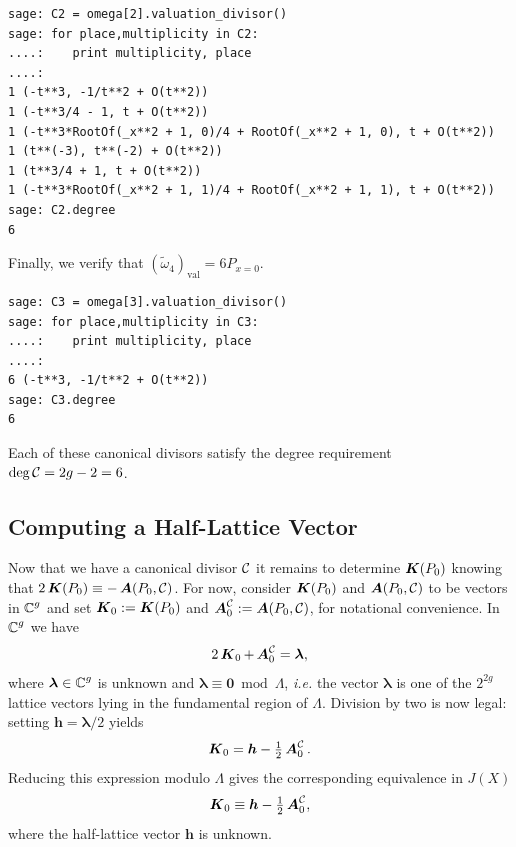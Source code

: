 \begin{example}
\begin{lstlisting}
sage: C2 = omega[2].valuation_divisor()
sage: for place,multiplicity in C2:
....:    print multiplicity, place
....:
1 (-t**3, -1/t**2 + O(t**2))
1 (-t**3/4 - 1, t + O(t**2))
1 (-t**3*RootOf(_x**2 + 1, 0)/4 + RootOf(_x**2 + 1, 0), t + O(t**2))
1 (t**(-3), t**(-2) + O(t**2))
1 (t**3/4 + 1, t + O(t**2))
1 (-t**3*RootOf(_x**2 + 1, 1)/4 + RootOf(_x**2 + 1, 1), t + O(t**2))
sage: C2.degree
6
\end{lstlisting}
Finally, we verify that $(\tilde{\omega}_4)_\text{val} = 6P_{x=0}$.
\begin{lstlisting}
sage: C3 = omega[3].valuation_divisor()
sage: for place,multiplicity in C3:
....:    print multiplicity, place
....:
6 (-t**3, -1/t**2 + O(t**2))
sage: C3.degree
6
\end{lstlisting}
Each of these canonical divisors satisfy the degree requirement $\deg \operatorname{\mathcal{C}} =
2g-2 = 6$.
\end{example}


\subsection{Computing a Half-Lattice Vector}


Now that we have a canonical divisor $\operatorname{\mathcal{C}}$ it remains to determine $\operatorname{\boldsymbol{K}}(P_0)$
knowing that $2\operatorname{\boldsymbol{K}}(P_0) \equiv - \operatorname{\boldsymbol{A}}(P_0,\operatorname{\mathcal{C}})$. For now, consider
$\operatorname{\boldsymbol{K}}(P_0)$ and $\operatorname{\boldsymbol{A}}(P_0,\operatorname{\mathcal{C}})$ to be vectors in $\operatorname{\mathbb{C}}^g$ and set $\operatorname{\boldsymbol{K}}_0 :=
\operatorname{\boldsymbol{K}}(P_0)$ and $\operatorname{\boldsymbol{A}}_0^{\operatorname{\mathcal{C}}} := \operatorname{\boldsymbol{A}}(P_0,\operatorname{\mathcal{C}})$, for notational
convenience. In $\operatorname{\mathbb{C}}^g$ we have
\begin{equation}
2\operatorname{\boldsymbol{K}}_0 + \operatorname{\boldsymbol{A}}_0^{\operatorname{\mathcal{C}}} = \boldsymbol{\lambda},
\end{equation}
where $\boldsymbol{\lambda} \in \operatorname{\mathbb{C}}^g$ is unknown and $\boldsymbol{\lambda}
\equiv \boldsymbol{0} \bmod{\Lambda}$, {\it i.e.} the vector
$\boldsymbol{\lambda}$ is one of the $2^{2g}$ lattice vectors lying in the
fundamental region of $\Lambda$. Division by two is now legal: setting
$\boldsymbol{h} = \boldsymbol{\lambda}/2$ yields
\begin{equation}
\operatorname{\boldsymbol{K}}_0 = \boldsymbol{h} - \tfrac{1}{2} \operatorname{\boldsymbol{A}}_0^{\operatorname{\mathcal{C}}}.
\end{equation}
Reducing this expression modulo $\Lambda$ gives the corresponding equivalence in
$J(X)$
\begin{equation}
\operatorname{\boldsymbol{K}}_0 \equiv \boldsymbol{h} - \tfrac{1}{2} \operatorname{\boldsymbol{A}}_0^{\operatorname{\mathcal{C}}},
\end{equation}
where the half-lattice vector $\boldsymbol{h}$ is unknown.

